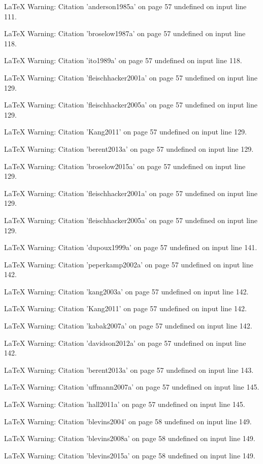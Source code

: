 LaTeX Warning: Citation 'anderson1985a' on page 57 undefined on input line 111.


LaTeX Warning: Citation 'broselow1987a' on page 57 undefined on input line 118.


LaTeX Warning: Citation 'ito1989a' on page 57 undefined on input line 118.


LaTeX Warning: Citation 'fleischhacker2001a' on page 57 undefined on input line 129.


LaTeX Warning: Citation 'fleischhacker2005a' on page 57 undefined on input line 129.


LaTeX Warning: Citation 'Kang2011' on page 57 undefined on input line 129.


LaTeX Warning: Citation 'berent2013a' on page 57 undefined on input line 129.


LaTeX Warning: Citation 'broselow2015a' on page 57 undefined on input line 129.


LaTeX Warning: Citation 'fleischhacker2001a' on page 57 undefined on input line 129.


LaTeX Warning: Citation 'fleischhacker2005a' on page 57 undefined on input line 129.


LaTeX Warning: Citation 'dupoux1999a' on page 57 undefined on input line 141.


LaTeX Warning: Citation 'peperkamp2002a' on page 57 undefined on input line 142.


LaTeX Warning: Citation 'kang2003a' on page 57 undefined on input line 142.


LaTeX Warning: Citation 'Kang2011' on page 57 undefined on input line 142.


LaTeX Warning: Citation 'kabak2007a' on page 57 undefined on input line 142.


LaTeX Warning: Citation 'davidson2012a' on page 57 undefined on input line 142.


LaTeX Warning: Citation 'berent2013a' on page 57 undefined on input line 143.


LaTeX Warning: Citation 'uffmann2007a' on page 57 undefined on input line 145.


LaTeX Warning: Citation 'hall2011a' on page 57 undefined on input line 145.


LaTeX Warning: Citation 'blevins2004' on page 58 undefined on input line 149.


LaTeX Warning: Citation 'blevins2008a' on page 58 undefined on input line 149.


LaTeX Warning: Citation 'blevins2015a' on page 58 undefined on input line 149.



